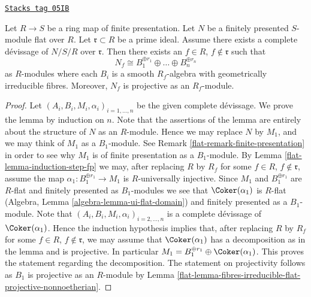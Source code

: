 \begin{lemma}
\label{flat-lemma-complete-devissage-flat-finitely-presented-module}
\href{https://stacks.math.columbia.edu/tag/05IB}{\texttt{Stacks tag 05IB}}

Let $R \to S$ be a ring map of finite presentation.
Let $N$ be a finitely presented $S$-module flat over $R$.
Let $\mathfrak r \subset R$ be a prime ideal.
Assume there exists a complete d\'evissage of $N/S/R$ over $\mathfrak r$.
Then there exists an $f \in R$, $f \not \in \mathfrak r$
such that
$$
N_f \cong B_1^{\oplus r_1} \oplus \ldots \oplus B_n^{\oplus r_n}
$$
as $R$-modules where each $B_i$ is a smooth $R_f$-algebra with geometrically
irreducible fibres. Moreover, $N_f$ is projective as an $R_f$-module.
\end{lemma}

\begin{proof}

Let $(A_i, B_i, M_i, \alpha_i)_{i = 1, \ldots, n}$ be the given
complete d\'evissage. We prove the lemma by induction on $n$.
Note that the assertions of the lemma are entirely about the structure
of $N$ as an $R$-module. Hence we may replace $N$ by $M_1$, and we
may think of $M_1$ as a $B_1$-module. See
Remark \ref{flat-remark-finite-presentation}
in order to see why $M_1$ is of finite presentation as a $B_1$-module. By
Lemma \ref{flat-lemma-induction-step-fp}
we may, after replacing $R$ by $R_f$ for some
$f \in R$, $f \not \in \mathfrak r$, assume
the map $\alpha_1 : B_1^{\oplus r_1} \to M_1$ is $R$-universally injective.
Since $M_1$ and $B_1^{\oplus r_1}$ are $R$-flat and finitely presented as
$B_1$-modules we see that $\Coker(\alpha_1)$ is $R$-flat
(Algebra, Lemma \ref{algebra-lemma-ui-flat-domain})
and finitely presented as a $B_1$-module. Note that
$(A_i, B_i, M_i, \alpha_i)_{i = 2, \ldots, n}$ is a complete
d\'evissage of $\Coker(\alpha_1)$. Hence the induction hypothesis
implies that, after replacing
$R$ by $R_f$ for some $f \in R$, $f \not \in \mathfrak r$,
we may assume that $\Coker(\alpha_1)$ has a decomposition
as in the lemma and is projective. In particular
$M_1 = B_1^{\oplus r_1} \oplus \Coker(\alpha_1)$.
This proves the statement regarding the decomposition.
The statement on projectivity follows as $B_1$ is projective as
an $R$-module by
Lemma \ref{flat-lemma-fibres-irreducible-flat-projective-nonnoetherian}.
\end{proof}

